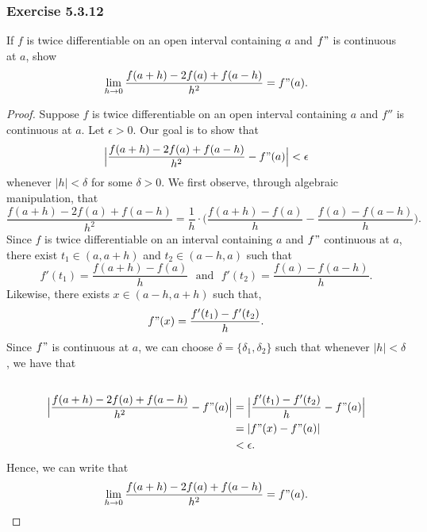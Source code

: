 \subsubsection{Exercise 5.3.12} If \( f  \) is twice differentiable on an open interval containing \( a  \) and \( f" \) is continuous at \( a  \), show 
\[  \lim_{ h \to 0 }  \frac{ f(a+h) - 2f(a) + f(a-h)  }{ h^2  } = f"(a). \]
\begin{proof}
Suppose \( f  \) is twice differentiable on an open interval containing \( a  \) and \( f''  \) is continuous at \( a  \). Let \( \epsilon > 0  \). Our goal is to show that 
\[  \Big| \frac{ f(a+h) - 2 f(a) + f(a-h)  }{ h^2  } - f"(a) \Big| < \epsilon \]
whenever \( | h  | < \delta  \) for some \( \delta > 0  \). We first observe, through algebraic manipulation, that 
\[ \frac{ f(a+h) - 2f(a) + f(a-h)  }{ h^2  } = \frac{ 1 }{ h } \cdot  \Big( \frac{ f(a+h) - f(a)  }{ h } - \frac{  f(a) - f(a-h)  }{ h } \Big). \tag{1} \]
Since \( f \) is twice differentiable on an interval containing \(  a \) and \( f" \) continuous at \( a \), there exist \( t_1 \in (a, a+h)  \) and \( t_2 \in (a-h, a)  \) such that 
\[ f'(t_1) = \frac{ f(a+h) - f(a)  }{ h } \text{~ and ~} f'(t_2) = \frac{ f(a) - f(a-h)  }{ h }.  \]
Likewise, there exists \( x \in (a-h, a+h)  \) such that, 
\[  f"(x) = \frac{ f'(t_1) - f'(t_2)   }{ h }. \] Since \( f" \) is continuous at \( a  \), we can choose \( \delta = \{ \delta_1, \delta_2  \}  \) such that whenever \( | h  |  < \delta  \), we have that 
\begin{align*}
    & \\
    \Big| \frac{ f(a+h) - 2 f(a) + f(a-h)  }{ h^2  } - f"(a) \Big| &= \Big| \frac{ f'(t_1) - f'(t_2)  }{ h } - f"(a)  \Big| \\  
                                                                   &= | f"(x) - f"(a)  | \\
                                                                   &< \epsilon.
\end{align*}
Hence, we can write that 
\[  \lim_{ h \to 0 }  \frac{ f(a+h) - 2f(a) + f(a-h)  }{ h^2  } = f"(a). \]
\end{proof}






